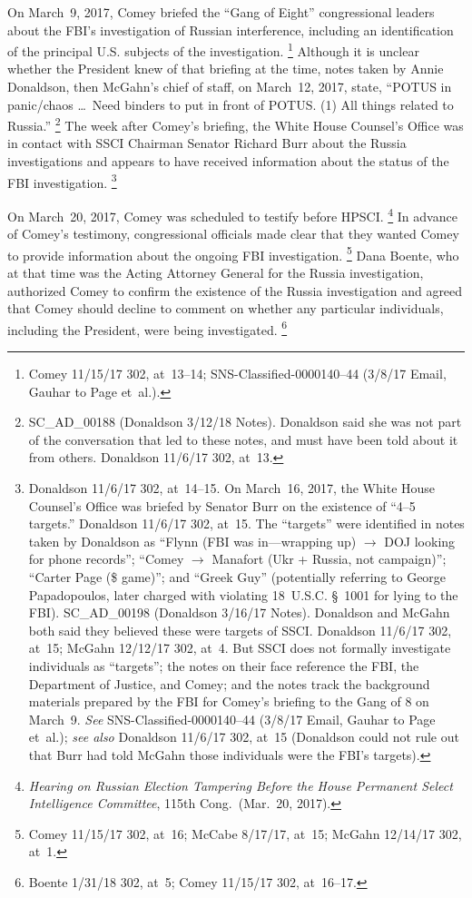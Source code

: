 On March~9, 2017, Comey briefed the ``Gang of Eight'' congressional leaders about the FBI's investigation of Russian interference, including an identification of the principal U.S. subjects of the investigation.%
\footnote{Comey 11/15/17 302, at~13--14;
SNS-Classified-0000140--44 (3/8/17 Email, Gauhar to Page et~al.).}
Although it is unclear whether the President knew of that briefing at the time, notes taken by Annie Donaldson, then McGahn's chief of staff, on March~12, 2017, state, ``POTUS in panic/chaos \dots\ Need binders to put in front of POTUS. (1) All things related to Russia.''%
\footnote{SC\_AD\_00188 (Donaldson 3/12/18 Notes).
Donaldson said she was not part of the conversation that led to these notes, and must have been told about it from others.
Donaldson 11/6/17 302, at~13.}
The week after Comey's briefing, the White House Counsel's Office was in contact with SSCI Chairman Senator Richard Burr about the Russia investigations and appears to have received information about the status of the FBI investigation.%
\footnote{Donaldson 11/6/17 302, at~14--15.
On March~16, 2017, the White House Counsel's Office was briefed by Senator Burr on the existence of ``4--5 targets.''
Donaldson 11/6/17 302, at~15.
The ``targets'' were identified in notes taken by Donaldson as ``Flynn (FBI was in---wrapping up) $\longrightarrow$ DOJ looking for phone records'';
``Comey $\longrightarrow$ Manafort (Ukr + Russia, not campaign)'';
``Carter Page (\$ game)'';
and ``Greek Guy'' (potentially referring to George Papadopoulos, later charged with violating 18~U.S.C. \S~1001 for lying to the FBI).
SC\_AD\_00198 (Donaldson 3/16/17 Notes).
Donaldson and McGahn both said they believed these were targets of SSCI\null.
Donaldson 11/6/17 302, at~15;
McGahn 12/12/17 302, at~4.
But SSCI does not formally investigate individuals as ``targets'';
the notes on their face reference the FBI, the Department of Justice, and Comey;
and the notes track the background materials prepared by the FBI for Comey's briefing to the Gang of 8 on March~9.
\textit{See} SNS-Classified-0000140--44 (3/8/17 Email, Gauhar to Page et~al.);
\textit{see also} Donaldson 11/6/17 302, at~15 (Donaldson could not rule out that Burr had told McGahn those individuals were the FBI's targets).}

On March~20, 2017, Comey was scheduled to testify before HPSCI\null.%
\footnote{\textit{Hearing on Russian Election Tampering Before the House Permanent Select Intelligence Committee}, 115th Cong.\ (Mar.~20, 2017).}
In advance of Comey's testimony, congressional officials made clear that they wanted Comey to provide information about the ongoing FBI investigation.%
\footnote{Comey 11/15/17 302, at~16;
McCabe 8/17/17, at~15;
McGahn 12/14/17 302, at~1.}
Dana Boente, who at that time was the Acting Attorney General for the Russia investigation, authorized Comey to confirm the existence of the Russia investigation and agreed that Comey should decline to comment on whether any particular individuals, including the President, were being investigated.%
\footnote{Boente 1/31/18 302, at~5;
Comey 11/15/17 302, at~16--17.}

